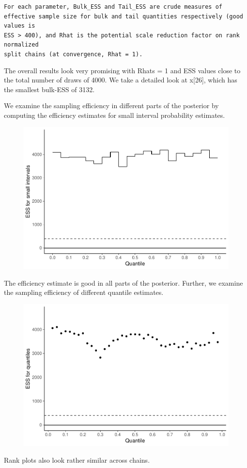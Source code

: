 \documentclass[american,]{article}
\begin{document}
\begin{verbatim}
For each parameter, Bulk_ESS and Tail_ESS are crude measures of 
effective sample size for bulk and tail quantities respectively (good values is 
ESS > 400), and Rhat is the potential scale reduction factor on rank normalized
split chains (at convergence, Rhat = 1).
\end{verbatim}

The overall results look very promising with Rhats = 1 and ESS values
close to the total number of draws of 4000. We take a detailed look at
x{[}26{]}, which has the smallest bulk-ESS of 3132.

We examine the sampling efficiency in different parts of the posterior
by computing the efficiency estimates for small interval probability
estimates.

\begin{figure}[t]
  \centering
  \includegraphics[width=0.6\linewidth]{graphics/local-ess-jags-nom-1.pdf}
\end{figure}

The efficiency estimate is good in all parts of the posterior. Further,
we examine the sampling efficiency of different quantile estimates.

\begin{figure}[t]
  \centering
  \includegraphics[width=0.6\linewidth]{graphics/quantile-ess-jags-nom-1.pdf}
\end{figure}

Rank plots also look rather similar across chains.
\end{document}
